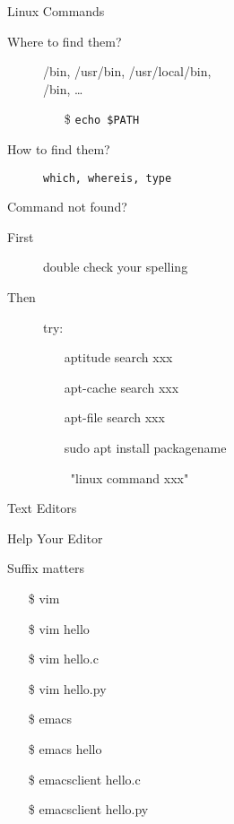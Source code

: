 \begin{frame}{Linux Commands}
  \begin{description}
  \item[Where to find them?] {\ttfamily /bin, /usr/bin, /usr/local/bin,\\/bin,
      \ldots}
    \begin{itemize}
    \item[\$] \texttt{echo \$PATH}
    \end{itemize}
  \item[How to find them?] \texttt{which, whereis, type}
  \end{description}
  \begin{block}{Command not found?}
    \begin{description}
    \item[First] double check your spelling
    \item[Then] try:{\ttfamily
      \begin{itemize}
      \item[\debian] aptitude search xxx
      \item[\debian] apt-cache search xxx
      \item[\debian] apt-file search xxx
      \item[\debian] sudo apt install packagename
      \item[\GG] \google~"linux command xxx"
      \end{itemize}}
    \end{description}
  \end{block}
\end{frame}

\begin{frame}{Text Editors}
  \begin{block}
    {
    }
    \begin{center}
    \end{center}
  \end{block}
\end{frame}

\begin{frame}{Help Your Editor}
  \begin{block}{Suffix matters}\ttfamily
    \begin{itemize}
    \item[\$] vim \wrong
    \item[\$] vim hello \wrong
    \item[\$] vim hello.c  \correct
    \item[\$] vim hello.py \correct
    \item[\$] emacs \wrong
    \item[\$] emacs hello \wrong
    \item[\$] emacsclient hello.c  \correct
    \item[\$] emacsclient hello.py \correct
    \end{itemize}
  \end{block}
\end{frame}

